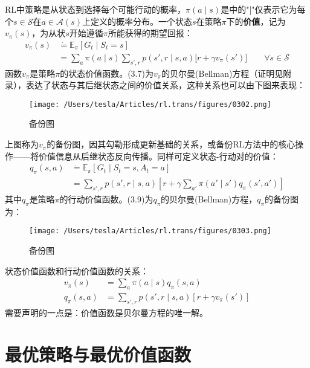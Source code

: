 \documentclass{ctexart}
\begin{document}
RL中策略是从状态到选择每个可能行动的概率，$\pi(a\mid s)$是中的"|"仅表示它为每个$s \in \mathcal S$在$a \in \mathcal A(s)$上定义的概率分布。一个状态$s$在策略$\pi$下的\textbf{价值}，记为$v_\pi(s)$，为从状$s$开始遵循$\pi$所能获得的期望回报：
\begin{align}
    v_\pi(s) &\dot= \mathbb E_\pi[G_t\mid S_t=s] \\
             &= \sum_a\pi(a\mid s)\sum_{s',r} p(s',r\mid s,a)\bigl[ r+\gamma v_\pi(s') \bigr] \qquad \forall s \in \mathcal S
\end{align}
函数$v_\pi$是策略$\pi$的状态价值函数。(3.7)为$v_\pi$的贝尔曼(Bellman)方程（证明见附录），表达了状态与其后继状态之间的价值关系，这种关系也可以由下图来表现：
\begin{figure}[htbp]
    \centering
    \texttt{[image: /Users/tesla/Articles/rl.trans/figures/0302.png]}
    \caption{备份图}
    \label{fig:0302} 
\end{figure}
上图称为$v_\pi$的备份图，因其勾勒形成更新基础的关系，或备份RL方法中的核心操作——将价值信息从后继状态反向传播。同样可定义状态-行动对的价值：
\begin{align}
    q_\pi(s,a) &\dot= \mathbb E_\pi\left[ G_t\mid S_t=s, A_t=a \right] \\
               &= \sum_{s',r} p(s',r\mid s,a) \left[ r+\gamma\sum_{a'}\pi(a'\mid s') q_\pi(s',a') \right]
\end{align}
其中$q_\pi$是策略$\pi$的行动价值函数。(3.9)为$q_\pi$的贝尔曼(Bellman)方程，$q_\pi$的备份图为：
\begin{figure}[htbp]
    \centering
    \texttt{[image: /Users/tesla/Articles/rl.trans/figures/0303.png]}
    \caption{备份图}
    \label{fig:0303} 
\end{figure}
状态价值函数和行动价值函数的关系：
\begin{align}
    v_\pi(s) &= \sum_a \pi(a\mid s)q_\pi(s,a) \tag{3.10}\\
    q_\pi(s,a) &= \sum_{s',r} p(s',r \mid s,a)[r+\gamma v_\pi(s')] \tag{3.11}
\end{align}
需要声明的一点是：价值函数是贝尔曼方程的唯一解。

\section{最优策略与最优价值函数}
\end{document}
